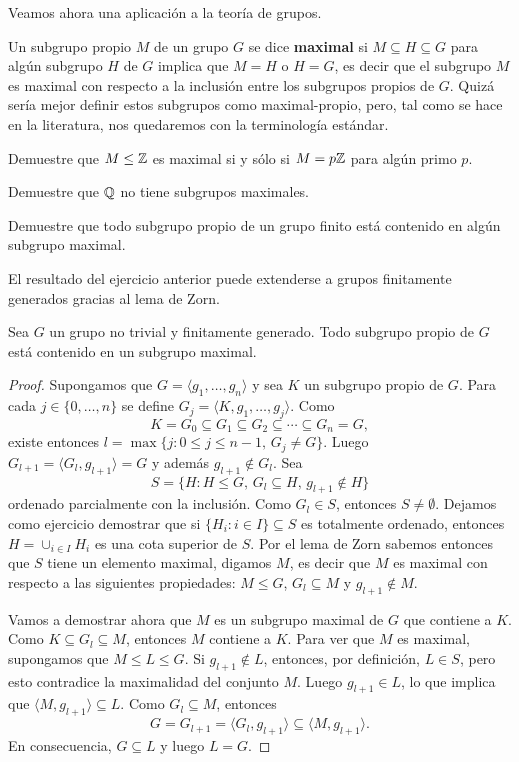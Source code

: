 Veamos ahora una aplicación a la teoría de grupos. 

Un subgrupo propio $M$ de un grupo $G$ se dice \textbf{maximal} si $M\subseteq H\subseteq G$ para algún subgrupo $H$ de $G$ implica que
$M=H$ o $H=G$, es decir que el subgrupo $M$ es maximal con respecto a la inclusión entre los subgrupos propios de $G$. Quizá sería
mejor definir estos subgrupos como maximal-propio, pero, tal como se hace en la literatura, nos quedaremos con la terminología estándar.  

\begin{exercise}
	Demuestre que $M\leq\mathbb{Z}$ es maximal si y sólo si $M=p\mathbb{Z}$ para algún primo $p$. 
\end{exercise}

\begin{exercise}
    Demuestre que $\mathbb{Q}$ no tiene subgrupos maximales.        
\end{exercise}

\begin{exercise}
        Demuestre que todo subgrupo propio de un grupo finito está contenido en
        algún subgrupo maximal.
\end{exercise}

El resultado del ejercicio anterior puede extenderse a grupos finitamente generados gracias al lema de Zorn. 

\begin{theorem}
Sea $G$ un grupo no trivial y finitamente generado. Todo subgrupo propio de $G$ está contenido en un subgrupo maximal.  	
\end{theorem}

\begin{proof}
	Supongamos que $G=\langle g_1,\dots,g_n\rangle$ y sea $K$ un subgrupo propio de $G$. Para cada $j\in\{0,\dots,n\}$ se define
	$G_j=\langle K,g_1,\dots,g_j\rangle$. Como
	\[
	K=G_0\subseteq G_1\subseteq G_2\subseteq\cdots\subseteq G_n=G,
	\]
	existe entonces $l=\max\{j:0\leq j\leq n-1,\,G_j\ne G\}$. Luego $G_{l+1}=\langle G_l,g_{l+1}\rangle=G$ y
	además $g_{l+1}\not\in G_l$. Sea
	\[
	S=\{H:H\leq G,\,G_l\subseteq H,\,g_{l+1}\not\in H\}
	\]
	ordenado parcialmente con la inclusión. Como $G_l\in S$, entonces $S\ne\emptyset$. Dejamos como ejercicio
	demostrar que si $\{H_i:i\in I\}\subseteq S$ es
	totalmente ordenado, entonces $H=\cup_{i\in I}H_i$ es una cota superior de $S$. Por el lema de Zorn sabemos
	entonces que $S$ tiene un elemento maximal, digamos $M$, es decir que $M$ es maximal con 
	respecto a las siguientes propiedades: $M\leq G$, $G_l\subseteq M$ y $g_{l+1}\not\in M$.   
	
	Vamos a demostrar ahora que $M$ es un subgrupo maximal de $G$ que contiene a $K$. 
	Como $K\subseteq G_l\subseteq M$, entonces $M$ contiene a $K$. Para ver que $M$ es maximal, supongamos que
	$M\leq L\leq G$. Si $g_{l+1}\not\in L$, entonces, por definición, $L	\in S$, pero esto contradice la maximalidad
	del conjunto $M$. Luego $g_{l+1}\in L$, lo que implica que $\langle M,g_{l+1}\rangle\subseteq L$. Como $G_l\subseteq M$, entonces
	\[
	G=G_{l+1}=\langle G_l,g_{l+1}\rangle\subseteq \langle M,g_{l+1}\rangle.   
	\]
	En consecuencia, $G\subseteq L$ y luego $L=G$. 
\end{proof}

